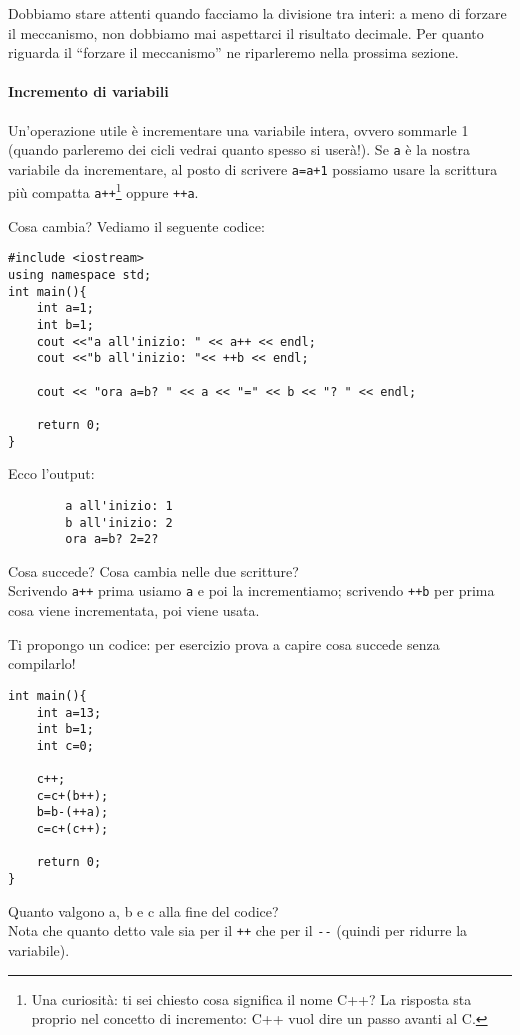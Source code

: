 	Dobbiamo stare attenti quando facciamo la divisione tra interi: a meno di forzare il meccanismo, non dobbiamo mai aspettarci il risultato decimale. Per quanto riguarda il ``forzare il meccanismo'' ne riparleremo nella prossima sezione.
	
	\paragraph{Incremento di variabili} Un'operazione utile è incrementare una variabile intera, ovvero sommarle 1 (quando parleremo dei cicli vedrai quanto spesso si userà!). Se \verb|a| è la nostra variabile da incrementare, al posto di scrivere \verb|a=a+1| possiamo usare la scrittura più compatta \verb|a++|\footnote{Una curiosità: ti sei chiesto cosa significa il nome C++? La risposta sta proprio nel concetto di incremento: C++ vuol dire un passo avanti al C.} oppure \verb|++a|.
	
	Cosa cambia? Vediamo il seguente codice:
	\begin{lstlisting}
#include <iostream>
using namespace std;
int main(){
	int a=1;
	int b=1;
	cout <<"a all'inizio: " << a++ << endl;
	cout <<"b all'inizio: "<< ++b << endl;
	
	cout << "ora a=b? " << a << "=" << b << "? " << endl;
	
	return 0;
}
	\end{lstlisting}
	Ecco l'output:
	\begin{shaded}
		\begin{verbatim}
		a all'inizio: 1
		b all'inizio: 2
		ora a=b? 2=2? 
		\end{verbatim}
	\end{shaded}
	Cosa succede? Cosa cambia nelle due scritture?\\
	Scrivendo \verb|a++| prima usiamo \verb|a| e poi la incrementiamo; scrivendo \verb|++b| per prima cosa viene incrementata, poi viene usata. 
	
	Ti propongo un codice: per esercizio prova a capire cosa succede senza compilarlo!
	\begin{lstlisting}
int main(){
	int a=13;
	int b=1;
	int c=0;
	
	c++;
	c=c+(b++);	
	b=b-(++a);
	c=c+(c++);
		
	return 0;
}
	\end{lstlisting}
	Quanto valgono a, b e c alla fine del codice?\\
	
	Nota che quanto detto vale sia per il \verb|++| che per il \verb|--| (quindi per ridurre la variabile).
	
